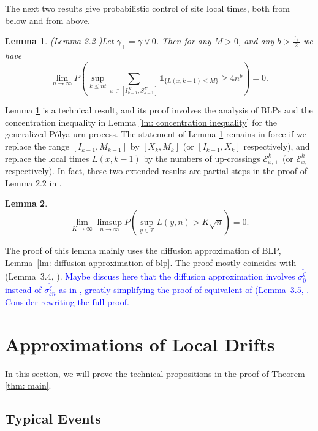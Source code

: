 \documentclass[twoside,12pt,a4paper]{article}
\newtheorem{lemma}{Lemma}[section]
\numberwithin{equation}{section}
\newcommand{\comment}[1]{\textcolor{blue}{#1}}
\begin{document}
		
		The next two results give probabilistic control of site local times, both from below and from above.

		\begin{lemma}(Lemma 2.2 \cite{KMP22})\label{lm: number of rarely visit sites}
			Let $\gamma_+ = \gamma \vee 0$. Then for any $M>0$, and any $b>\frac{\gamma_+}{2}$ we have
			$$
			\lim_{n\to\infty} P\left(\sup_{k\leq nt}  \sum_{x\in [I^X_{k-1}, S^X_{k-1}]} \mathbb{1}_{\{ L(x,k-1) \leq M \}} \geq 4n^b \right) = 0.
			$$
			
		\end{lemma}	
		Lemma \ref{lm: number of rarely visit sites} is a technical result, and its proof involves the analysis of BLPs and the concentration inequality in Lemma \ref{lm: concentration inequality} for the generalized P\'{o}lya urn process. The statement of Lemma \ref{lm: number of rarely visit sites} remains in force if we replace the range $[I_{k-1}, M_{k-1}]$ by $[X_k,M_k]$ (or $[I_{k-1},X_k]$ respectively), and replace the local times $L(x,k-1)$ by the numbers of up-crossings $\mathcal{E}^{k}_{x,+}$ (or $\mathcal{E}^{k}_{x,-}$ respectively). In fact, these two extended results are partial steps in the proof of Lemma 2.2 in \cite{KMP22}.   

\begin{lemma}
	\label{lm: uniform control of local time}
	\[
		\lim_{K \to  \infty } \limsup_{n \to \infty } P\left( \sup_{y \in \mathbb{Z}} L\left( y, n \right) > K \sqrt{n}  \right) = 0
	.\] 
\end{lemma}
The proof of this lemma mainly uses the diffusion approximation of BLP, Lemma~\ref{lm: diffusion approximation of blp}. The proof mostly coincides with (Lemma~3.4, \cite{KP16}). 
\comment{Maybe discuss here that the diffusion approximation involves $\sigma_0^{\tilde \zeta}$ instead of $\sigma_{\varepsilon n}^{\tilde \zeta}$ as in \cite{KP16}, greatly simplifying the proof of equivalent of (Lemma~3.5, \cite{KP16}. Consider rewriting the full proof.
}
		
		
		\section{Approximations of Local Drifts}\label{sec: approximations}
		In this section, we will prove the technical propositions in the proof of Theorem \ref{thm: main}.

		\subsection{Typical Events}
		
\end{document}
